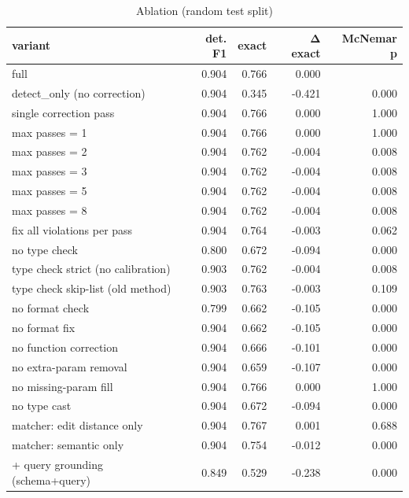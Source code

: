 \begin{table}[t]
\centering
\caption{Ablation (random test split)}
\label{tab:ablation_random}
\begin{tabular}{lrrrr}
\hline
variant & det. F1 & exact & Δ exact & McNemar p \\
\hline
full & 0.904 & 0.766 & 0.000 &  \\
detect\_only (no correction) & 0.904 & 0.345 & -0.421 & 0.000 \\
single correction pass & 0.904 & 0.766 & 0.000 & 1.000 \\
max passes = 1 & 0.904 & 0.766 & 0.000 & 1.000 \\
max passes = 2 & 0.904 & 0.762 & -0.004 & 0.008 \\
max passes = 3 & 0.904 & 0.762 & -0.004 & 0.008 \\
max passes = 5 & 0.904 & 0.762 & -0.004 & 0.008 \\
max passes = 8 & 0.904 & 0.762 & -0.004 & 0.008 \\
fix all violations per pass & 0.904 & 0.764 & -0.003 & 0.062 \\
no type check & 0.800 & 0.672 & -0.094 & 0.000 \\
type check strict (no calibration) & 0.903 & 0.762 & -0.004 & 0.008 \\
type check skip-list (old method) & 0.903 & 0.763 & -0.003 & 0.109 \\
no format check & 0.799 & 0.662 & -0.105 & 0.000 \\
no format fix & 0.904 & 0.662 & -0.105 & 0.000 \\
no function correction & 0.904 & 0.666 & -0.101 & 0.000 \\
no extra-param removal & 0.904 & 0.659 & -0.107 & 0.000 \\
no missing-param fill & 0.904 & 0.766 & 0.000 & 1.000 \\
no type cast & 0.904 & 0.672 & -0.094 & 0.000 \\
matcher: edit distance only & 0.904 & 0.767 & 0.001 & 0.688 \\
matcher: semantic only & 0.904 & 0.754 & -0.012 & 0.000 \\
+ query grounding (schema+query) & 0.849 & 0.529 & -0.238 & 0.000 \\
\hline
\end{tabular}
\end{table}
